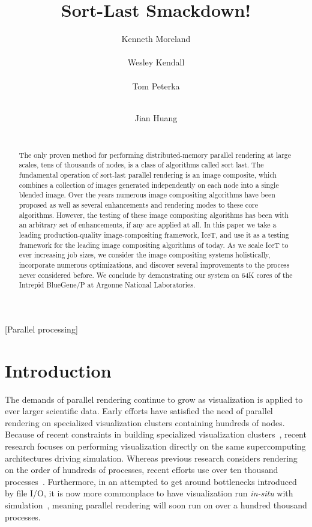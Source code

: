 \documentclass{acm_proc_article-sp}
\title{Sort-Last Smackdown!}
\author{
  \alignauthor Kenneth Moreland \\
  \affaddr{Sandia National Laboratories} \\
  \email{kmorel@sandia.gov}
  \alignauthor Wesley Kendall \\
  \affaddr{University of Tennessee, Knoxville} \\
  \email{kendall@eecs.utk.edu}
  \alignauthor Tom Peterka \\
  \affaddr{Argonne National Laboratory} \\
  \email{tpeterka@mcs.anl.gov}
  \and %
  \alignauthor Jian Huang \\
  \affaddr{University of Tennessee, Knoxville} \\
  \email{huangj@eecs.utk.edu}
}
\newcommand*{\lcite}[1]{~\cite{#1}}
\begin{document}
\sloppy

\maketitle

\begin{abstract}
  The only proven method for performing distributed-memory parallel
  rendering at large scales, tens of thousands of nodes, is a class of
  algorithms called sort last.  The fundamental operation of sort-last
  parallel rendering is an image composite, which combines a collection of
  images generated independently on each node into a single blended image.
  Over the years numerous image compositing algorithms have been proposed
  as well as several enhancements and rendering modes to these core
  algorithms.  However, the testing of these image compositing algorithms
  has been with an arbitrary set of enhancements, if any are applied at
  all.  In this paper we take a leading production-quality
  image-compositing framework, IceT, and use it as a testing framework for
  the leading image compositing algorithms of today.  As we scale IceT to
  ever increasing job sizes, we consider the image compositing systems
  holistically, incorporate numerous optimizations, and discover several
  improvements to the process never considered before.  We conclude by
  demonstrating our system on 64K cores of the Intrepid BlueGene/P at
  Argonne National Laboratories.
\end{abstract}


[Parallel processing]


\section{Introduction} 
\label{sec:Introduction}

The demands of parallel rendering continue to grow as visualization is
applied to ever larger scientific data.  Early efforts have satisfied the
need of parallel rendering on specialized visualization clusters containing
hundreds of nodes.  Because of recent constraints in building specialized
visualization clusters\lcite{Childs2007}, recent research focuses on
performing visualization directly on the same supercomputing architectures
driving simulation.  Whereas previous research considers rendering on the
order of hundreds of processes, recent efforts use over ten thousand
processes\lcite{Childs2010}.  Furthermore, in an attempted to get around
bottlenecks introduced by file I/O, it is now more commonplace to have
visualization run \emph{in-situ} with
simulation\lcite{Ma2009:SciDACReview,Ma2009:CG&A,Yu2010,Tu2006}, meaning
parallel rendering will soon run on over a hundred thousand processes.
\end{document}
